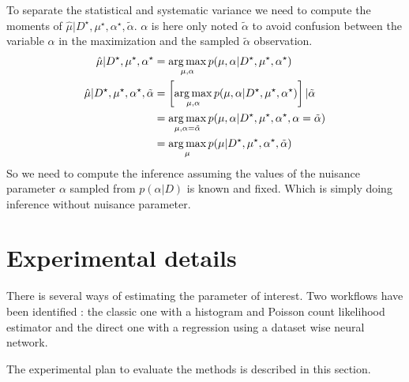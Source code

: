 To separate the statistical and systematic variance we need to compute the moments of $\hat \mu | D^\star, \mu^\star, \alpha^\star, \tilde \alpha$.
$\alpha$ is here only noted $\tilde \alpha$ to avoid confusion between the variable $\alpha$ in the maximization and the sampled $\tilde \alpha$ observation. 
\begin{align}
\hat \mu | D^\star, \mu^\star, \alpha^\star & = \operatorname*{arg\,max}_{\mu, \alpha} p(\mu, \alpha| D^\star, \mu^\star, \alpha^\star) \\
\hat \mu | D^\star, \mu^\star, \alpha^\star, \tilde \alpha & = \left[ \operatorname*{arg\,max}_{\mu, \alpha} p(\mu, \alpha| D^\star, \mu^\star, \alpha^\star) \right] | \tilde \alpha \\
	& = \operatorname*{arg\,max}_{\mu, \alpha=\tilde \alpha} p(\mu, \alpha| D^\star, \mu^\star, \alpha^\star, \alpha = \tilde \alpha) \\
	& = \operatorname*{arg\,max}_{\mu} p(\mu | D^\star, \mu^\star, \alpha^\star, \tilde \alpha) \\
\end{align}
So we need to compute the inference assuming the values of the nuisance parameter $\alpha$ sampled from $p(\alpha|D)$ is known and fixed.
Which is simply doing inference without nuisance parameter.












\section{Experimental details} %
\label{sec:experimental_details}





There is several ways of estimating the parameter of interest.
Two workflows have been identified : the classic one with a histogram and Poisson count likelihood estimator and the direct one with a regression using a dataset wise neural network.

The experimental plan to evaluate the methods is described in this section.









